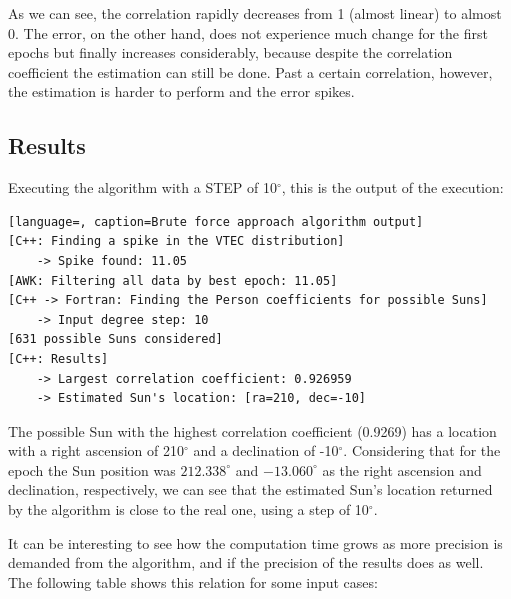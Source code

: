 As we can see, the correlation rapidly decreases from 1 (almost linear) to almost 0. The error, on the other hand, does not experience much change for the first epochs but finally increases considerably, because despite the correlation coefficient the estimation can still be done. Past a certain correlation, however, the estimation is harder to perform and the error spikes. 

\subsection{Results}

Executing the algorithm with a STEP of 10$^{\circ}$, this is the output of the execution:

\begin{minipage}{\linewidth}
\begin{lstlisting}[language=, caption=Brute force approach algorithm output]
[C++: Finding a spike in the VTEC distribution]
	-> Spike found: 11.05
[AWK: Filtering all data by best epoch: 11.05]
[C++ -> Fortran: Finding the Person coefficients for possible Suns]
	-> Input degree step: 10
[631 possible Suns considered]
[C++: Results]
	-> Largest correlation coefficient: 0.926959
	-> Estimated Sun's location: [ra=210, dec=-10]
\end{lstlisting}
\end{minipage}

The possible Sun with the highest correlation coefficient (0.9269) has a location with a right ascension of 210$^{\circ}$ and a declination of -10$^{\circ}$. Considering that for the epoch the Sun position was $212.338^{\circ}$ and $-13.060^{\circ}$ as the right ascension and declination, respectively, we can see that the estimated Sun's location returned by the algorithm is close to the real one, using a step of 10$^{\circ}$.

It can be interesting to see how the computation time grows as more precision is demanded from the algorithm, and if the precision of the results does as well. The following table shows this relation for some input cases:

\clearpage

